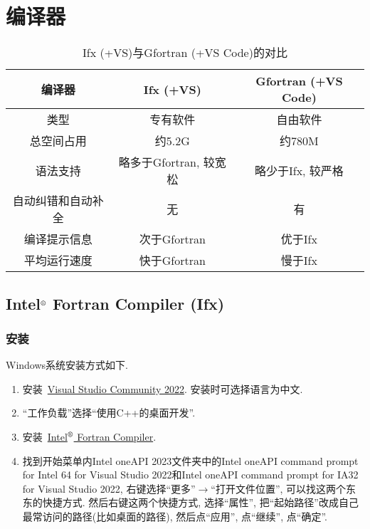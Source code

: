 \chapter{编译器}\label{fortran_compiler}
\def\r{${}^\text{\textregistered}$}

\begin{table}[!htbp]
    \centering
    \begin{tabular}{|c|c|c|}
        \hline
        编译器&Ifx (+VS)&Gfortran (+VS Code)\\
        \hline
        类型&专有软件&自由软件\\
        \hline
        总空间占用&约5.2G&约780M\\
        \hline
        语法支持&略多于Gfortran, 较宽松&略少于Ifx, 较严格\\
        \hline
        自动纠错和自动补全&无&有\\
        \hline
        编译提示信息&次于Gfortran&优于Ifx\\
        \hline
        平均运行速度&快于Gfortran&慢于Ifx\\
        \hline
    \end{tabular}
    \caption{Ifx (+VS)与Gfortran (+VS Code)的对比}
\end{table}

\section[Intel\r{} Fortran Compiler]{Intel\r{} Fortran Compiler (Ifx)}

\subsection{安装}

Windows系统安装方式如下.
\begin{enumerate}
    \item 安装~\href{https://visualstudio.microsoft.com/zh-hans/thank-you-downloading-visual-studio/?sku=Community&channel=Release&version=VS2022&source=VSLandingPage&cid=2030&passive=false}
    {Visual Studio Community 2022}. 安装时可选择语言为中文.
    \item ``工作负载''选择``使用C++的桌面开发''.
    \item 安装~\href{https://registrationcenter-download.intel.com/akdlm/IRC_NAS/1720594b-b12c-4aca-b7fb-a7d317bac5cb/w_fortran-compiler_p_2023.2.1.7.exe}
    {Intel\r{} Fortran Compiler}.
    \item 找到开始菜单内Intel oneAPI 2023文件夹中的Intel oneAPI command prompt for Intel 64 for Visual Studio 2022和Intel oneAPI command prompt for IA32 for Visual Studio 2022, 右键选择``更多''$\rightarrow$``打开文件位置'', 可以找这两个东东的快捷方式. 然后右键这两个快捷方式, 选择``属性'', 把``起始路径''改成自己最常访问的路径(比如桌面的路径), 然后点``应用'', 点``继续'', 点``确定''.\label{to_desktop}
\end{enumerate}

